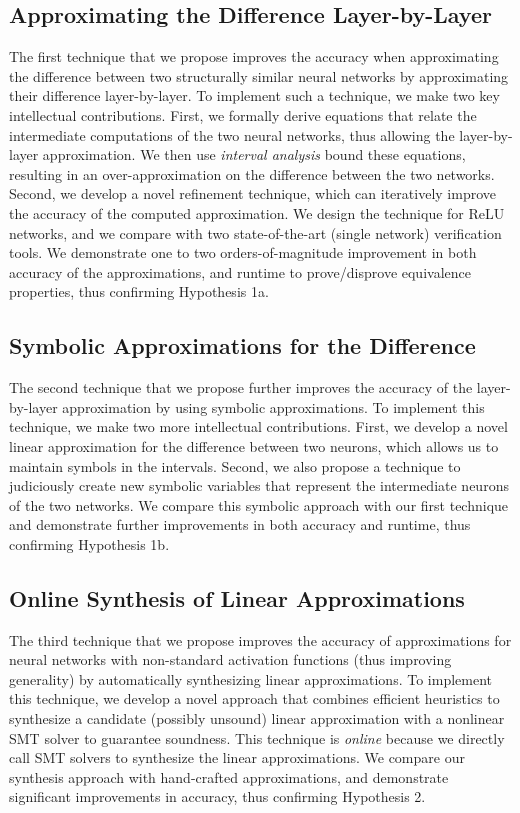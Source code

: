 \subsection{Approximating the Difference Layer-by-Layer}
The first technique that we propose improves the accuracy when approximating the
difference between two structurally similar neural networks by approximating
their difference layer-by-layer. To implement such a technique, we make two key
intellectual contributions. First, we formally derive equations that relate the
intermediate computations of the two neural networks, thus allowing the
layer-by-layer approximation. We then use \textit{interval analysis} bound these
equations, resulting in an over-approximation on the difference between the two
networks. Second, we develop a novel refinement technique, which can
iteratively improve the accuracy of the computed approximation. We
design the technique for ReLU networks, and we compare with two state-of-the-art
(single network) verification tools. We demonstrate one to two
orders-of-magnitude improvement in both accuracy of the approximations, and
runtime to prove/disprove equivalence properties, thus confirming Hypothesis 1a.

\subsection{Symbolic Approximations for the Difference}
The second technique that we propose further improves the accuracy of the
layer-by-layer approximation by using symbolic approximations. To implement this
technique, we make two more intellectual contributions. First, we develop a novel
linear approximation for the difference between two neurons, which allows us to
maintain symbols in the intervals. Second, we also propose a technique to
judiciously create new symbolic variables that represent the intermediate neurons
of the two networks. We compare this symbolic approach with our first technique
and demonstrate further improvements in both accuracy and runtime, thus
confirming Hypothesis 1b.

\subsection{Online Synthesis of Linear Approximations}
The third technique that we propose improves the accuracy of approximations for
neural networks with non-standard activation functions (thus improving
generality) by automatically synthesizing linear approximations. To implement
this technique, we develop a novel approach that combines efficient heuristics to
synthesize a candidate (possibly unsound) linear approximation with a nonlinear
SMT solver to guarantee soundness. This technique is \textit{online} because we
directly call SMT solvers to synthesize the linear approximations. We compare our
synthesis approach with hand-crafted approximations, and demonstrate significant
improvements in accuracy, thus confirming Hypothesis 2.

